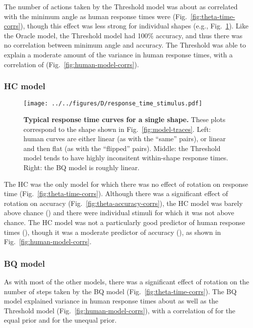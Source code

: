 \documentclass[10pt,letterpaper]{article}
\newcommand{\Oc}[0]{Oracle}
\newcommand{\Th}[0]{Threshold}
\newcommand{\Hc}[0]{HC}
\newcommand{\Bq}[0]{BQ}
\begin{document}
The number of actions taken by the \Th{} model was about as correlated
with the minimum angle as human response times were
(Fig.~\ref{fig:theta-time-corrs}), though this effect was less strong
for individual shapes (e.g.,
Fig.~\ref{fig:response-time-stimulus}). Like the \Oc{} model, the
\Th{} model had 100\% accuracy, and thus there was no correlation
between minimum angle and accuracy. The \Th{} was able to explain a
moderate amount of the variance in human response times, with a
correlation of \ThTimeCorr{} (Fig.~\ref{fig:human-model-corrs}).

\subsubsection{\Hc{} model}

\begin{figure}[t]
  \begin{center}
    \texttt{[image: ../../figures/D/response\_time\_stimulus.pdf]}
    \caption{\textbf{Typical response time curves for a single shape.}
      These plots correspond to the shape shown in
      Fig.~\ref{fig:model-traces}. Left: human curves are either
      linear (as with the ``same'' pairs), or linear and then flat (as
      with the ``flipped'' pairs). Middle: the \Th{} model tends to
      have highly inconsitent within-shape response times. Right: the
      \Bq{} model is roughly linear.}
    \label{fig:response-time-stimulus}
  \end{center}
\end{figure}

The \Hc{} was the only model for which there was no effect of rotation
on response time (Fig.~\ref{fig:theta-time-corrs}). Although there was
a significant effect of rotation on accuracy
(Fig.~\ref{fig:theta-accuracy-corrs}), the \Hc{} model was barely
above chance (\HcAccuracy{}) and there were \HcNumChance{} individual
stimuli for which it was not above chance. The \Hc{} model was not a
particularly good predictor of human response times (\HcTimeCorr{}),
though it was a moderate predictor of accuracy (\HcAccuracyCorr{}), as
shown in Fig.~\ref{fig:human-model-corrs}.

\subsubsection{\Bq{} model}

As with most of the other models, there was a significant effect of
rotation on the number of steps taken by the \Bq{} model
(Fig.~\ref{fig:theta-time-corrs}). The \Bq{} model explained variance
in human response times about as well as the \Th{} model
(Fig.~\ref{fig:human-model-corrs}), with a correlation of
\BqTimeCorr{} for the equal prior and \BqpTimeCorr{} for the unequal
prior.  
\end{document}
